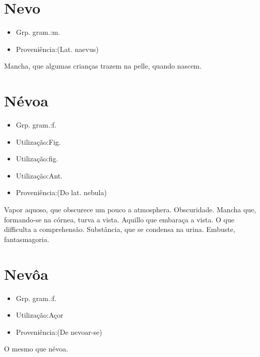 \section{Nevo}
\begin{itemize}
\item {Grp. gram.:m.}
\end{itemize}
\begin{itemize}
\item {Proveniência:(Lat. \textunderscore naevus\textunderscore )}
\end{itemize}
Mancha, que algumas crianças trazem na pelle, quando nascem.
\section{Névoa}
\begin{itemize}
\item {Grp. gram.:f.}
\end{itemize}
\begin{itemize}
\item {Utilização:Fig.}
\end{itemize}
\begin{itemize}
\item {Utilização:fig.}
\end{itemize}
\begin{itemize}
\item {Utilização:Ant.}
\end{itemize}
\begin{itemize}
\item {Proveniência:(Do lat. \textunderscore nebula\textunderscore )}
\end{itemize}
Vapor aquoso, que obscurece um pouco a atmosphera.
Obscuridade.
Mancha que, formando-se na córnea, turva a vista.
Aquillo que embaraça a vista.
O que difficulta a comprehensão.
Substância, que se condensa na urina.
Embuste, fantasmagoria.
\section{Nevôa}
\begin{itemize}
\item {Grp. gram.:f.}
\end{itemize}
\begin{itemize}
\item {Utilização:Açor}
\end{itemize}
\begin{itemize}
\item {Proveniência:(De \textunderscore nevoar-se\textunderscore )}
\end{itemize}
O mesmo que \textunderscore névoa\textunderscore .
